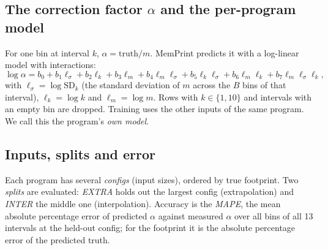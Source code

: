 \documentclass[11pt]{article}
\newcommand{\memprint}{MemPrint}
\newcommand{\term}[1]{\emph{#1}}
\begin{document}
\subsection{The correction factor $\alpha$ and the per-program model}
\label{sec:model}

For one bin at interval $k$, $\alpha = \text{truth}/m$. \memprint{} predicts it with a log-linear model with
interactions:
\begin{equation}
\log\alpha = b_0 + b_1 \ell_\sigma + b_2 \ell_k + b_3 \ell_m + b_4 \ell_m\ell_\sigma + b_5 \ell_k\ell_\sigma
+ b_6 \ell_m \ell_k + b_7 \ell_m\ell_\sigma\ell_k ,
\label{eq:model}
\end{equation}
with $\ell_\sigma = \log \mathrm{SD}_k$ (the standard deviation of $m$ across the $B$ bins of that interval),
$\ell_k = \log k$ and $\ell_m = \log m$. Rows with $k \in \{1,10\}$ and intervals with an empty bin are dropped.
Training uses the other inputs of the same program. We call this the program's \term{own model}.

\subsection{Inputs, splits and error}

Each program has several \term{configs} (input sizes), ordered by true footprint. Two \term{splits} are evaluated:
\term{EXTRA} holds out the largest config (extrapolation) and \term{INTER} the middle one (interpolation). Accuracy is
the \term{MAPE}, the mean absolute percentage error of predicted $\alpha$ against measured $\alpha$ over all bins
of all 13 intervals at the held-out config; for the footprint it is the absolute percentage error of the predicted
truth.
\end{document}

